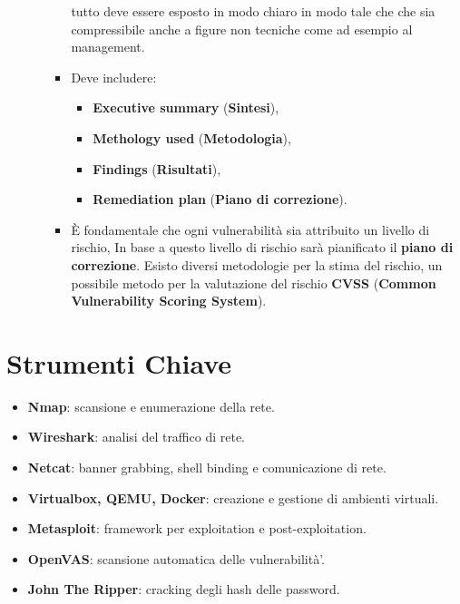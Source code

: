 \documentclass[12pt]{article}
\begin{document}
\begin{enumerate}
\begin{enumerate}
\begin{itemize}
            tutto deve essere esposto in modo chiaro in modo tale che che sia 
            compressibile anche a figure non tecniche come ad esempio al 
            management. 
            \item Deve includere:
            \begin{itemize}
                \item \textbf{Executive summary} (\textbf{Sintesi}),
                \item \textbf{Methology used} (\textbf{Metodologia}),
                \item \textbf{Findings} (\textbf{Risultati}),
                \item \textbf{Remediation plan} (\textbf{Piano di correzione}).
            \end{itemize}
            \item \`{E} fondamentale che ogni vulnerabilit\`{a} sia attribuito 
            un livello di rischio, In base a questo livello di rischio sar\`{a} 
            pianificato il \textbf{piano di correzione}. Esisto diversi metodologie
            per la stima del rischio, un possibile metodo per la valutazione del 
            rischio \textbf{CVSS} (\textbf{Common Vulnerability Scoring System}).
        \end{itemize}
    \end{enumerate}
    
\end{enumerate}




\section{Strumenti Chiave}
\begin{itemize}
    \item \textbf{Nmap}: scansione e enumerazione della rete.
    \item \textbf{Wireshark}: analisi del traffico di rete.
    \item \textbf{Netcat}: banner grabbing, shell binding e comunicazione di rete.
    \item \textbf{Virtualbox, QEMU, Docker}: creazione e gestione di ambienti virtuali.
    \item \textbf{Metasploit}: framework per exploitation e post-exploitation.
    \item \textbf{OpenVAS}: scansione automatica delle vulnerabilit\`{a}'.
    \item \textbf{John The Ripper}: cracking degli hash delle password. 
\end{itemize}
\end{document}
